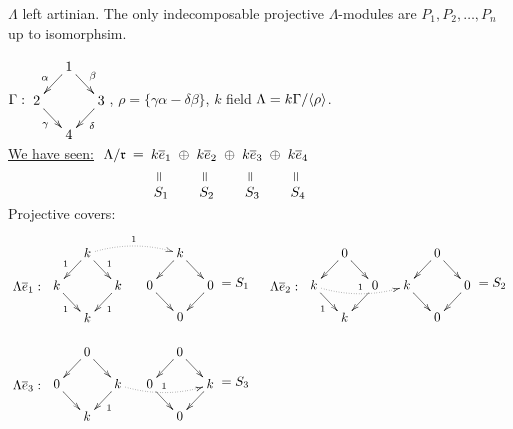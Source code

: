 \begin{cor}\label{prop:33}
$\Lambda$ left artinian. The only indecomposable projective
$\Lambda$-modules are $P_1, P_2, \ldots, P_n$ up to isomorphsim. 
\end{cor}
\begin{exam}
$\G : 
\vcenter{\xymatrix@C-1pc@R-1pc{
&1 \ar[dl]_\alpha \ar[dr]^\beta &\\
2 \ar[dr]_\gamma &&3 \ar[dl]^\delta\\
&4&
}}$, $\rho = \{ \gamma\alpha-\delta\beta \}$, $k$ field $\Lambda = k\Gamma / \langle \rho \rangle$.\\
\underline{We have seen:} $\xymatrix@C-1pc@R-1pc{
\Lambda/\mathfrak{r} \ar@{}[r]|-*[@]{=} & k\overline{e}_1 \ar@{}[r]|-*[@]{\oplus}\ar@{}[d]|-*[@]{=} & k\overline{e}_2 \ar@{}[r]|-*[@]{\oplus}\ar@{}[d]|-*[@]{=} & k\overline{e}_3 \ar@{}[r]|-*[@]{\oplus}\ar@{}[d]|-*[@]{=} & k\overline{e}_4 \ar@{}[d]|-*[@]{=}\\
                     & S_1              & S_2              & S_3              & S_4
}$\\
Projective covers:
\[
\begin{matrix}
\xy
\POS(25, 0)
\xymatrix"S1"@C-1pc@R-1pc{
&k \ar[dl] \ar[dr]&\\
0\ar[dr] && 0 \ar[dl]\\
&0&
}
\POS+(23, -8)
\xymatrix{
= S_1}
\POS(0,0)
\xymatrix"e1"{
&k \ar[dl]_1 \ar[dr]^1 \ar@{.>}@/^/["S1"]^1&\\
k \ar[dr]_1 && k \ar[dl]^1\\
&k&
}
\POS(-8, -9)
\xymatrix{
\Lambda \overline{e}_1:}
\endxy

&

\xy
\POS(25, 0)
\xymatrix"S1"@C-1pc@R-1pc{
&0 \ar[dl] \ar[dr]&\\
k\ar[dr] && 0 \ar[dl]\\
&0&
}
\POS+(23, -8)
\xymatrix{
= S_2}
\POS(0,0)
\xymatrix"e1"{
&0 \ar[dl] \ar[dr] &\\
k \ar[dr]_1 \ar@{.>}@/_/["S1"]^1 && 0 \ar[dl]\\
&k&
}
\POS(-8, -9)
\xymatrix{
\Lambda \overline{e}_2:}
\endxy

\\
\\

\xy
\POS(25, 0)
\xymatrix"S1"@C-1pc@R-1pc{
&0 \ar[dl] \ar[dr]&\\
0\ar[dr] && k \ar[dl]\\
&0&
}
\POS+(23, -8)
\xymatrix{
= S_3}
\POS(0,0)
\xymatrix"e1"{
&0 \ar[dl] \ar[dr] &\\
0 \ar[dr]  && k \ar[dl]^1 \ar@{.>}@/_/["S1"]^1\\
&k&
}
\POS(-8, -9)
\xymatrix{
\Lambda \overline{e}_3:}
\endxy


\end{matrix}\]
\end{exam}
